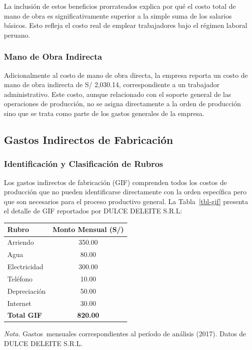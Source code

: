 \documentclass[
  stu,
  floatsintext,
  longtable,
  a4paper,
  nolmodern,
  notxfonts,
  notimes,
  12pt,
  colorlinks=true,linkcolor=blue,citecolor=blue,urlcolor=blue]{apa7}
\newcounter{none} %
\begin{document}
La inclusión de estos beneficios prorrateados explica por qué el costo
total de mano de obra es significativamente superior a la simple suma de
los salarios básicos. Esto refleja el costo real de emplear trabajadores
bajo el régimen laboral peruano.

\subsubsection{Mano de Obra Indirecta}\label{mano-de-obra-indirecta}

Adicionalmente al costo de mano de obra directa, la empresa reporta un
costo de mano de obra indirecta de S/ 2,030.14, correspondiente a un
trabajador administrativo. Este costo, aunque relacionado con el soporte
general de las operaciones de producción, no se asigna directamente a la
orden de producción sino que se trata como parte de los gastos generales
de la empresa.

\subsection{Gastos Indirectos de
Fabricación}\label{gastos-indirectos-de-fabricaciuxf3n-1}

\subsubsection{Identificación y Clasificación de
Rubros}\label{identificaciuxf3n-y-clasificaciuxf3n-de-rubros}

Los gastos indirectos de fabricación (GIF) comprenden todos los costos
de producción que no pueden identificarse directamente con la orden
específica pero que son necesarios para el proceso productivo general.
La Tabla~\ref{tbl-gif} presenta el detalle de GIF reportados por DULCE
DELEITE S.R.L:

\begin{table}

{\caption{{Gastos Indirectos de Fabricación}{\label{tbl-gif}}}}

{\def\LTcaptype{none} %
\begin{longtable}[]{@{}lc@{}}
\toprule\noalign{}
Rubro & Monto Mensual (S/) \\
\midrule\noalign{}
\endhead
\bottomrule\noalign{}
\endlastfoot
Arriendo & 350.00 \\
Agua & 80.00 \\
Electricidad & 300.00 \\
Teléfono & 10.00 \\
Depreciación & 50.00 \\
Internet & 30.00 \\
\textbf{Total GIF} & \textbf{820.00} \\
\end{longtable}
}

\noindent \emph{Nota.} Gastos~mensuales correspondientes al período de
análisis (2017). Datos de DULCE DELEITE S.R.L.

\end{table}
\end{document}

